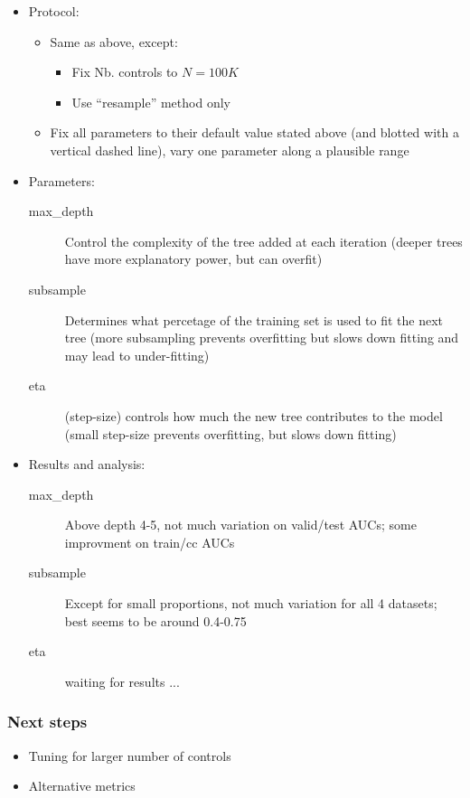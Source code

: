 \documentclass[12pt]{article}
\begin{document}
\begin{itemize}
	\item Protocol:
	\begin{itemize}
		\item Same as above, except:
		\begin{itemize}
			\item Fix Nb. controls to $N=100K$
			\item Use ``resample'' method only
		\end{itemize}
		\item Fix all parameters to their default value stated above (and blotted with a vertical dashed line), vary one parameter along a plausible range
	\end{itemize}
	\item Parameters:
		\begin{description}
			\item[max\_depth] Control the complexity of the tree added at each iteration (deeper trees have more explanatory power, but can overfit)
			\item[subsample] Determines what percetage of the training set is used to fit the next tree (more subsampling prevents overfitting but slows down fitting and may lead to under-fitting)
			\item[eta] (step-size) controls how much the new tree contributes to the model (small step-size prevents overfitting, but slows down fitting)
		\end{description}
	\item Results and analysis:
	\begin{description}
		\item[max\_depth] Above depth 4-5, not much variation on valid/test AUCs; some improvment on train/cc AUCs
		\item[subsample] Except for small proportions, not much variation for all 4 datasets; best seems to be around 0.4-0.75
		\item[eta] waiting for results ...
	\end{description}
\end{itemize}


\subsubsection*{Next steps}

\begin{itemize}
	\item Tuning for larger number of controls
	\item Alternative metrics
\end{itemize}
\end{document}
